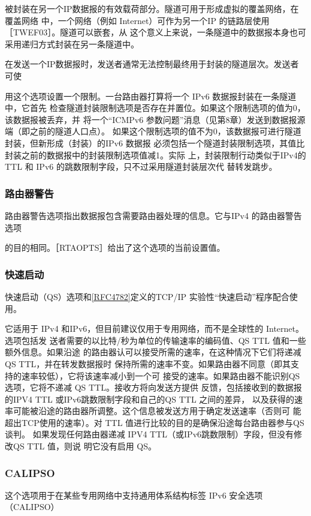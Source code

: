 被封装在另一个IP数据报的有效载荷部分。隧道可用于形成虚拟的覆盖网络，在覆盖网络
中，一个网络（例如 Internet）可作为另一个IP 的链路层使用［TWEF03］。隧道可以嵌套，从
这个意义上来说，一条隧道中的数据报本身也可采用递归方式封装在另一条隧道中。

在发送一个IP数据报时，发送者通常无法控制最终用于封装的隧道层次。发送者可使

用这个选项设置一个限制。一台路由器打算将一个 IPv6 数据报封装在一条隧道中，它首先
检查隧道封装限制选项是否存在并置位。如果这个限制选项的值为0，该数据报被丢弃，并
将一个“ICMPv6 参数问题”消息（见第8章）发送到数据报源端（即之前的隧道人口点）。
如果这个限制选项的值不为0，该数据报可进行隧道封装，但新形成（封装）的IPv6 数据报
必须包括一个隧道封装限制选项，其值比封装之前的数据报中的封装限制选项值减1。实际
上，封装限制行动类似于IPv4的TTL 和 IPv6 的跳数限制字段，只不过采用隧道封装层次代
替转发跳步。

\subsubsection{路由器警告}
路由器警告选项指出数据报包含需要路由器处理的信息。它与IPv4 的路由器警告选项

的目的相同。［RTAOPTS］给出了这个选项的当前设置值。

\subsubsection{快速启动}
快速启动（QS）选项和\href{https://www.rfc-editor.org/rfc/rfc4782}{[RFC4782]}定义的TCP/IP 实验性“快速启动”程序配合使用。

它适用于 IPv4 和IPv6，但目前建议仅用于专用网络，而不是全球性的 Internet。选项包括发
送者需要的以比特/秒为单位的传输速率的编码值、QS TTL 值和一些额外信息。如果沿途
的路由器认可以接受所需的速率，在这种情况下它们将递减QS TTL，并在转发数据报时
保持所需的速率不变。如果路由器不同意（即其支持的速率较低），它将该速率减小到一个可
接受的速率。如果路由器不能识别QS选项，它将不递减 QS TTL。接收方将向发送方提供
反馈，包括接收到的数据报的IPV4 TTL 或IPv6跳数限制字段和自己的QS TTL 之间的差异，
以及获得的速率可能被沿途的路由器所调整。这个信息被发送方用于确定发送速率（否则可
能超出TCP使用的速率）。对 TTL 值进行比较的目的是确保沿途每台路由器参与QS谈判。
如果发现任何路由器递减 IPV4 TTL（或IPv6跳数限制）字段，但没有修改QS TTL 值，则说
明它没有启用 QS。

\subsubsection{CALIPSO}
这个选项用于在某些专用网络中支持通用体系结构标签 IPv6 安全选项（CALIPSO）

